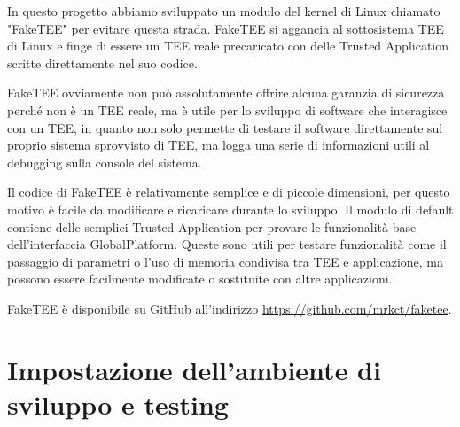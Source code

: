 \documentclass[12pt,italian]{report}
\begin{document}
In questo progetto abbiamo sviluppato un modulo del kernel di Linux chiamato
"FakeTEE" per evitare questa strada. FakeTEE si aggancia al sottosistema TEE
di Linux e finge di essere un TEE reale precaricato con delle
Trusted Application scritte direttamente nel suo codice.

FakeTEE ovviamente non può assolutamente offrire alcuna garanzia di sicurezza
perché non è un TEE reale, ma è utile per lo sviluppo di software che
interagisce con un TEE, in quanto non solo permette di testare il software
direttamente sul proprio sistema sprovvisto di TEE, ma logga una serie di
informazioni utili al debugging sulla console del sistema.

Il codice di FakeTEE è relativamente semplice e di piccole dimensioni, per
questo motivo è facile da modificare e ricaricare durante lo sviluppo.
Il modulo di default contiene delle semplici Trusted Application per provare
le funzionalità base dell'interfaccia GlobalPlatform.
Queste sono utili per testare funzionalità come il passaggio di parametri o
l'uso di memoria condivisa tra TEE e applicazione, ma possono essere
facilmente modificate o sostituite con altre applicazioni.

FakeTEE è disponibile su GitHub all'indirizzo
\url{https://github.com/mrkct/faketee}.

\chapter{Impostazione dell'ambiente di sviluppo e testing}
\label{app:impostazione-ambiente-sviluppo-testing}



\end{document}
